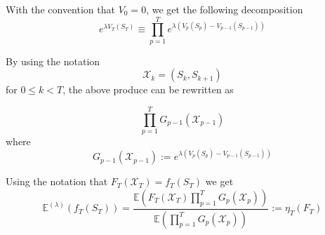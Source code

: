 \begin{frame}
	With the convention that $V_0 = 0$, we get the following decomposition
	$$e^{\lambda V_T(S_T)} \equiv \prod_{p=1}^{T} e^{\lambda (V_p(S_p) - V_{p-1}(S_{p-1}))}$$
																				
	By using the notation $$\mathcal{X}_k = (S_k, S_{k+1})$$ for $0 \leq k < T$, the above produce can be rewritten as
																				
	$$\prod_{p=1}^{T} G_{p-1}(\mathcal{X}_{p-1})$$ where
	$$G_{p-1}(\mathcal{X}_{p-1}) := e^{\lambda (V_p(S_p) - V_{p-1}(S_{p-1}))}$$
\end{frame}
\begin{frame}
	Using the notation that $F_T(\mathcal{X}_T) = f_T(S_T)$ we get
	\begin{equation}
		\mathbb{E}^{(\lambda)}(f_T(S_T)) = \frac{\mathbb{E}(F_T(\mathcal{X}_T)\prod_{p=1}^{T}G_p(\mathcal{X}_p))}{\mathbb{E}(\prod_{p=1}^{T}G_p(\mathcal{X}_p))} := \eta_T(F_T)
	\end{equation}
\end{frame}
